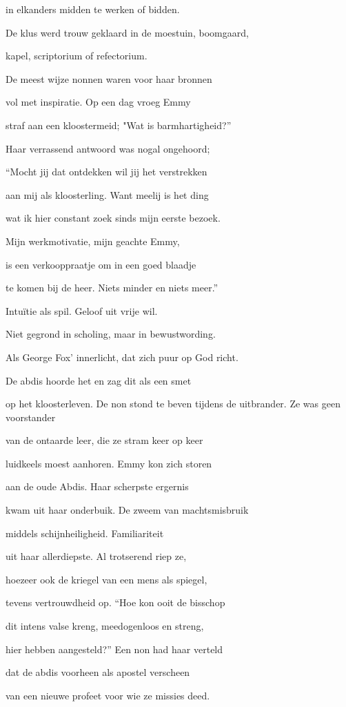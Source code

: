 in elkanders midden
te werken of bidden.

De klus werd trouw geklaard
in de moestuin, boomgaard,

kapel, scriptorium
of refectorium.

De meest wijze nonnen
waren voor haar bronnen

vol met inspiratie.
Op een dag vroeg Emmy

straf aan een kloostermeid;
"Wat is barmhartigheid?”

Haar verrassend antwoord
was nogal ongehoord;

“Mocht jij dat ontdekken
wil jij het verstrekken

aan mij als kloosterling.
Want meelij is het ding

wat ik hier constant zoek
sinds mijn eerste bezoek.

Mijn werkmotivatie,
mijn geachte Emmy,

is een verkooppraatje
om in een goed blaadje

te komen bij de heer.
Niets minder en niets meer.”

Intuïtie als spil.
Geloof uit vrije wil.

Niet gegrond in scholing,
maar in bewustwording.

Als George Fox' innerlicht,
dat zich puur op God richt.

De abdis hoorde het
en zag dit als een smet

op het kloosterleven.
De non stond te beven
tijdens de uitbrander.
Ze was geen voorstander

van de ontaarde leer,
die ze stram keer op keer

luidkeels moest aanhoren.
Emmy kon zich storen

aan de oude Abdis.
Haar scherpste ergernis

kwam uit haar onderbuik.
De zweem van machtsmisbruik

middels schijnheiligheid.
Familiariteit

uit haar allerdiepste.
Al trotserend riep ze,

hoezeer ook de kriegel
van een mens als spiegel,

tevens vertrouwdheid op.
“Hoe kon ooit de bisschop

dit intens valse kreng,
meedogenloos en streng,

hier hebben aangesteld?”
Een non had haar verteld

dat de abdis voorheen
als apostel verscheen

van een nieuwe profeet
voor wie ze missies deed.

